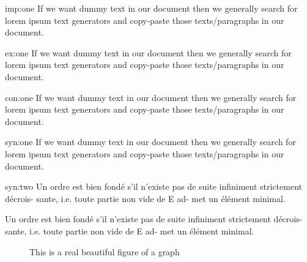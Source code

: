\documentclass[12pt, french]{report}
\begin{document}
\begin{important}[]{imp:one}
  If we want dummy text in our document then we generally search for lorem ipsum text generators and copy-paste those texts/paragraphs in our document.
\end{important}

\newpage

\begin{exercise}[]{ex:one}
  If we want dummy text in our document then we generally search for lorem ipsum text generators and copy-paste those texts/paragraphs in our document.
\end{exercise}

\begin{contour}[]{con:one}
  If we want dummy text in our document then we generally search for lorem ipsum text generators and copy-paste those texts/paragraphs in our document.
\end{contour}

\begin{multicols}{2}
  \begin{synthese}[Rappel]{syn:one}
    If we want dummy text in our document then we generally search for lorem ipsum text generators and copy-paste those texts/paragraphs in our document.
  \end{synthese}
  \begin{synthese}{syn:two}
    Un ordre est bien fondé s'il n'existe pas
    de suite infiniment strictement décrois-
    sante, i.e. toute partie non vide de E ad-
    met un élément minimal.
    \smallskip

    Un ordre est bien fondé s'il n'existe pas
    de suite infiniment strictement décrois-
    sante, i.e. toute partie non vide de E ad-
    met un élément minimal.
  \end{synthese}
\end{multicols}

\begin{figure}[ht]
  \centering
  \caption{This is a real beautiful figure of a graph}
\end{figure}
\end{document}
